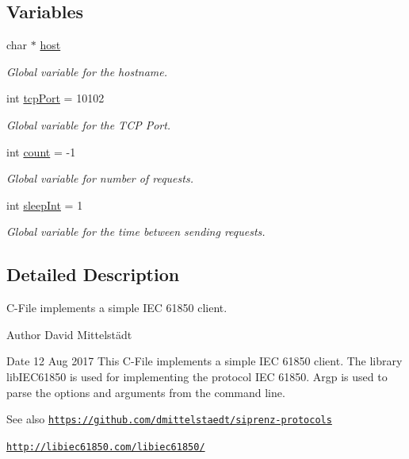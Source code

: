 \subsection*{Variables}
\begin{DoxyCompactItemize}
\item 
char $\ast$ \hyperlink{simple-iec61850-client_8c_a1c2046dcb30a629d6d9f45ff8f403f12}{host}
\begin{DoxyCompactList}\small\item\em Global variable for the hostname. \end{DoxyCompactList}\item 
int \hyperlink{simple-iec61850-client_8c_ac31354d08316076b496efb2b3a2c69e6}{tcp\+Port} = 10102
\begin{DoxyCompactList}\small\item\em Global variable for the T\+CP Port. \end{DoxyCompactList}\item 
int \hyperlink{simple-iec61850-client_8c_ad43c3812e6d13e0518d9f8b8f463ffcf}{count} = -\/1
\begin{DoxyCompactList}\small\item\em Global variable for number of requests. \end{DoxyCompactList}\item 
int \hyperlink{simple-iec61850-client_8c_a7c0b25939579bd308b11966fb04288e0}{sleep\+Int} = 1
\begin{DoxyCompactList}\small\item\em Global variable for the time between sending requests. \end{DoxyCompactList}\end{DoxyCompactItemize}


\subsection{Detailed Description}
C-\/\+File implements a simple I\+EC 61850 client. 

\begin{DoxyAuthor}{Author}
David Mittelstädt 
\end{DoxyAuthor}
\begin{DoxyDate}{Date}
12 Aug 2017 This C-\/\+File implements a simple I\+EC 61850 client. The library lib\+I\+E\+C61850 is used for implementing the protocol I\+EC 61850. Argp is used to parse the options and arguments from the command line. 
\end{DoxyDate}
\begin{DoxySeeAlso}{See also}
\href{https://github.com/dmittelstaedt/siprenz-protocols}{\tt https\+://github.\+com/dmittelstaedt/siprenz-\/protocols} 

\href{http://libiec61850.com/libiec61850/}{\tt http\+://libiec61850.\+com/libiec61850/} 
\end{DoxySeeAlso}


